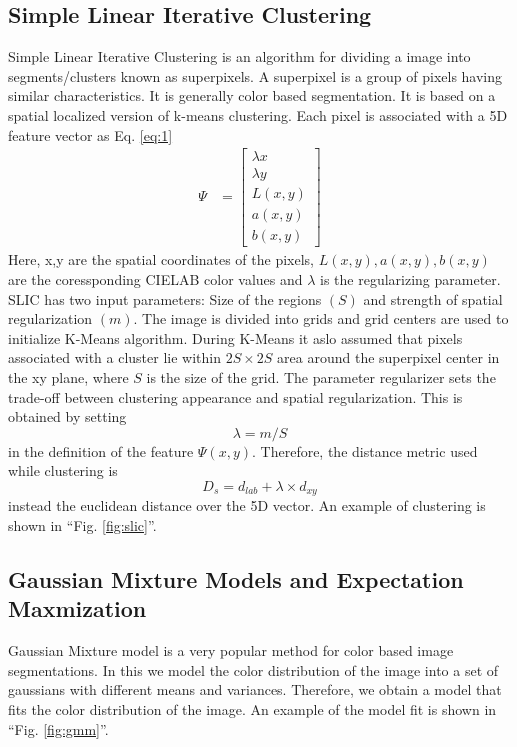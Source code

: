 \documentclass[conference]{IEEEtran}
\begin{document}
\subsection{Simple Linear Iterative Clustering}
Simple Linear Iterative Clustering \cite{slic} is an algorithm for dividing a image into segments/clusters known as superpixels. A superpixel is a group of pixels having similar characteristics. It is generally color based segmentation. It is based on a spatial localized version of k-means clustering. Each pixel is associated with a 5D feature vector as Eq. \ref{eq:1}\begin{align}\label{eq:1} \Psi  & = \begin{bmatrix} \lambda x\\ \lambda y\\ L(x,y) \\ a(x,y)\\b(x,y)\end{bmatrix} \end{align}
Here, x,y are the spatial coordinates of the pixels, $L(x,y), a(x,y), b(x,y)$ are the coressponding CIELAB color values and $\lambda$ is the regularizing parameter.  SLIC has two input parameters: Size of the regions $(S)$ and strength of spatial regularization $(m)$. The image is divided into grids and grid centers are used to initialize K-Means algorithm. During K-Means it aslo assumed that pixels associated with a cluster lie within $2S\times 2S$ area around the superpixel center in the xy plane, where $S$ is the size of the grid. The parameter regularizer sets the trade-off between clustering appearance and spatial regularization. This is obtained by setting 
\begin{equation} \lambda = m/S 
\end{equation} in the definition of the feature $\Psi(x,y)$. Therefore, the distance metric used while clustering is \begin{equation} D_{s} = d_{lab} + \lambda \times d_{xy}\end{equation} instead the euclidean distance over the 5D vector. An example of clustering is shown in ``Fig. \ref{fig:slic}''. 

\subsection{Gaussian Mixture Models and Expectation Maxmization}
Gaussian Mixture model is a very popular method for color based image segmentations. In this we model the color distribution of the image into a set of gaussians with different means and variances. Therefore, we obtain a model that fits the color distribution of the image. An example of the model fit is shown in ``Fig. \ref{fig:gmm}''.  
\end{document}
